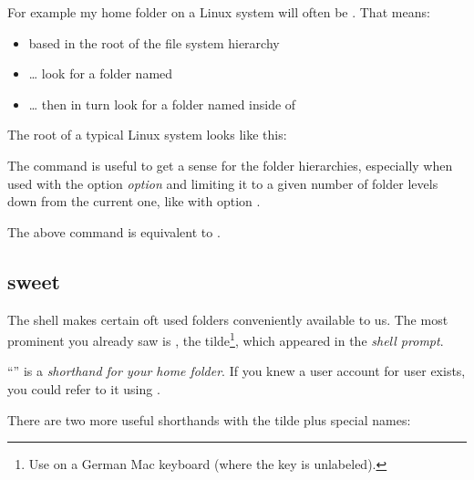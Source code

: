 \documentclass{olli-handout}
\begin{document}
For example my home folder on a Linux system will often be . That means:

\begin{itemize}
	\item based in the root of the file system hierarchy
	\item \ldots{} look for a folder named 
	\item \ldots{} then in turn look for a folder named  inside of 
\end{itemize}

The root of a typical Linux system looks like this:


\begin{hintbox}
{\olliPenRD} The  command is useful to get a sense for the folder hierarchies, especially when used with the option \emph{option}  and limiting it to a given number of folder levels down from the current one, like with option .

{\olliPenR} The above command  is equivalent to .
\end{hintbox}

\subsection{\texorpdfstring{\mytilde}{Home} sweet \texorpdfstring{\mytilde}{home}}

\begin{refmanbash}
\end{refmanbash}

The shell makes certain oft used folders conveniently available to us. The most prominent you already saw is \TTQ{\mytilde}, the tilde\footnote{Use  on a German Mac keyboard (where the key is unlabeled).}, which appeared in the \emph{shell prompt}.

{\olliHandLeft} ``{\mytilde}'' is a \emph{shorthand for your home folder}. If you knew a user account for user  exists, you could refer to it using .

There are two more useful shorthands with the tilde plus special names:
\end{document}
